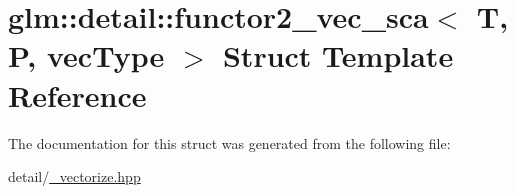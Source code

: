 \hypertarget{structglm_1_1detail_1_1functor2__vec__sca}{\section{glm\-:\-:detail\-:\-:functor2\-\_\-vec\-\_\-sca$<$ T, P, vec\-Type $>$ Struct Template Reference}
\label{structglm_1_1detail_1_1functor2__vec__sca}
}


The documentation for this struct was generated from the following file\-:\begin{DoxyCompactItemize}
\item 
detail/\hyperlink{__vectorize_8hpp}{\-\_\-vectorize.\-hpp}\end{DoxyCompactItemize}
